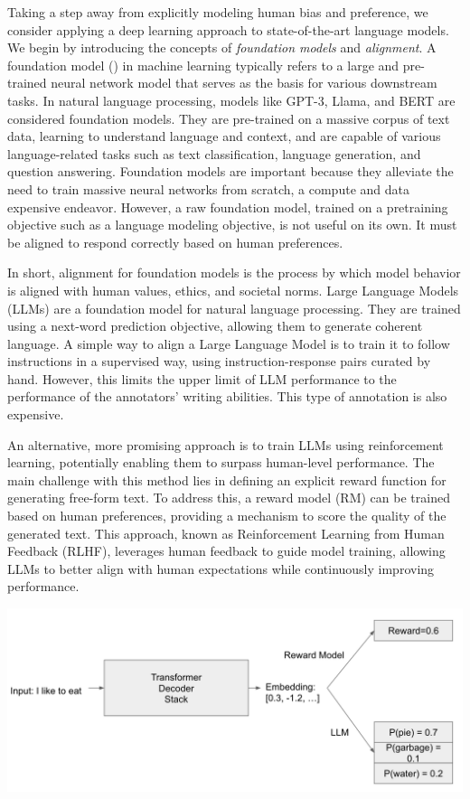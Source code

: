 \documentclass[
  letterpaper,
  DIV=11,
  numbers=noendperiod,
  oneside]{scrreprt}
\theoremstyle{remark}
\begin{document}
Taking a step away from explicitly modeling human bias and preference,
we consider applying a deep learning approach to state-of-the-art
language models. We begin by introducing the concepts of
\emph{foundation models} and \emph{alignment}. A foundation model
() in machine learning
typically refers to a large and pre-trained neural network model that
serves as the basis for various downstream tasks. In natural language
processing, models like GPT-3, Llama, and BERT are considered foundation
models. They are pre-trained on a massive corpus of text data, learning
to understand language and context, and are capable of various
language-related tasks such as text classification, language generation,
and question answering. Foundation models are important because they
alleviate the need to train massive neural networks from scratch, a
compute and data expensive endeavor. However, a raw foundation model,
trained on a pretraining objective such as a language modeling
objective, is not useful on its own. It must be aligned to respond
correctly based on human preferences.

In short, alignment for foundation models is the process by which model
behavior is aligned with human values, ethics, and societal norms. Large
Language Models (LLMs) are a foundation model for natural language
processing. They are trained using a next-word prediction objective,
allowing them to generate coherent language. A simple way to align a
Large Language Model is to train it to follow instructions in a
supervised way, using instruction-response pairs curated by hand.
However, this limits the upper limit of LLM performance to the
performance of the annotators' writing abilities. This type of
annotation is also expensive.

An alternative, more promising approach is to train LLMs using
reinforcement learning, potentially enabling them to surpass human-level
performance. The main challenge with this method lies in defining an
explicit reward function for generating free-form text. To address this,
a reward model (RM) can be trained based on human preferences, providing
a mechanism to score the quality of the generated text. This approach,
known as Reinforcement Learning from Human Feedback (RLHF), leverages
human feedback to guide model training, allowing LLMs to better align
with human expectations while continuously improving performance.

\includegraphics{Figures/arch.png}
\end{document}
